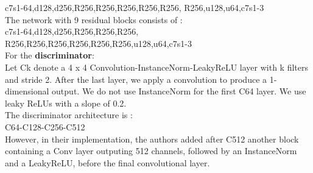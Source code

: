\documentclass[twocolumn,superscriptaddress,aps,floatfix, nofootinbib]{revtex4-1}
\begin{document}
    c7s1-64,d128,d256,R256,R256,R256,R256,R256,
    R256,u128,u64,c7s1-3\\
    
    The network with 9 residual blocks consists of :\\
    
    c7s1-64,d128,d256,R256,R256,R256,
    R256,R256,R256,R256,R256,R256,u128,u64,c7s1-3\\
    
    For the \textbf{discriminator}:\\
    
    Let Ck denote a 4 x 4 Convolution-InstanceNorm-LeakyReLU layer with k filters and stride 2. After the last layer, we apply a convolution to produce a 1-dimensional output. We do not use InstanceNorm for the first C64 layer. We use leaky ReLUs with a slope of 0.2.\\
    
    The discriminator architecture is :\\
    
    C64-C128-C256-C512\\
    
    However, in their implementation, the authors added after C512 another block containing a Conv layer outputing 512 channels, followed by an InstanceNorm and a LeakyReLU, before the final convolutional layer.
    
    
    
    \newpage
    
    
    
    \nocite{*}
\end{document}
